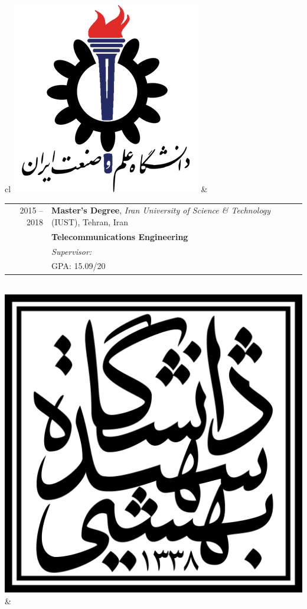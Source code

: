 
\begin{tabular}{cl}
	\includegraphics[scale=0.12]{graphics/IUST_logo_color} &
	\begin{tabular}{rl}
		\textsc{2015 --2018} & \textbf{Master’s Degree},  \emph{Iran University of Science \& Technology} (IUST),  Tehran, Iran            \\
		                     & \textbf{Telecommunications Engineering}                                                                      \\
		                     & \emph{Supervisor:\link{http://www.iust.ac.ir/content/45110/Dr.-Haddadi}{Assistant Professor Farzan Haddadi}} \\
		                     & \textsc{GPA}: 15.09/20                                                                                       \\
	\end{tabular}
	\\
	\includegraphics[scale=0.05]{graphics/SBU_logo}        &

\end{tabular}
